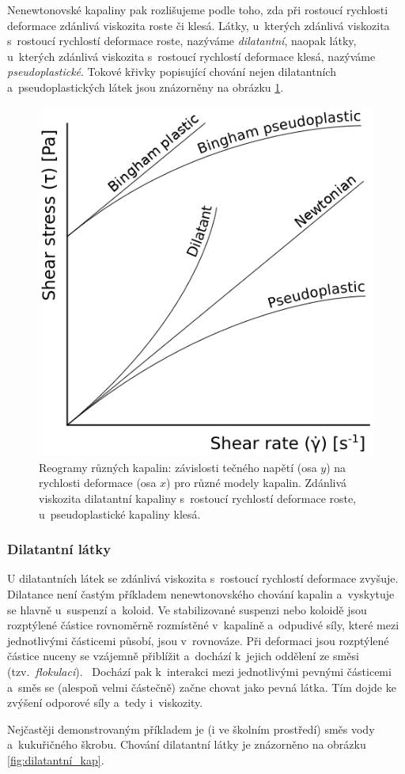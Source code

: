 \documentclass[12pt]{article}
\begin{document}
\par
Nenewtonovské kapaliny pak rozlišujeme podle toho, zda při rostoucí rychlosti deformace zdánlivá viskozita roste či klesá. Látky, u~kterých zdánlivá viskozita s~rostoucí rychlostí deformace roste, nazýváme \emph{dilatantní}, naopak látky, u~kterých zdánlivá viskozita s~rostoucí rychlostí deformace klesá, nazýváme \emph{pseudoplastické}. Tokové křivky popisující chování nejen dilatantních a~pseudoplastických látek jsou znázorněny na obrázku \ref{fig:rheology_diagram}.

\begin{figure}
    \centering
    \includegraphics[width = 0.5\linewidth]{figures/Rheology_of_time_independent_fluids.png}
    \caption{Reogramy různých kapalin: závislosti tečného napětí (osa $y$) na rychlosti deformace (osa $x$) pro různé modely kapalin. Zdánlivá viskozita dilatantní kapaliny s~rostoucí rychlostí deformace roste, u~pseudoplastické kapaliny klesá.~\cite{Figure:rheology_diagram}}
    \label{fig:rheology_diagram}
\end{figure}

\subsubsection{Dilatantní látky}%

U dilatantních látek se zdánlivá viskozita s~rostoucí rychlostí deformace zvyšuje. Dilatance není častým příkladem nenewtonovského chování kapalin a~vyskytuje se hlavně u~suspenzí a~koloid. Ve stabilizované suspenzi nebo koloidě jsou rozptýlené částice rovnoměrně rozmístěné v~kapalině a~odpudivé síly, které mezi jednotlivými částicemi působí, jsou v~rovnováze. Při deformaci jsou rozptýlené částice nuceny se vzájemně přiblížit a~dochází k~jejich oddělení ze směsi (tzv.~\emph{flokulaci}).~\cite{wiki:Flocculation}\cite{prez:teorie_koagulace} Dochází pak k~interakci mezi jednotlivými pevnými částicemi a~směs se (alespoň velmi částečně) začne chovat jako pevná látka. Tím dojde ke zvýšení odporové síly a~tedy i~viskozity.~\cite{wiki:Dilatant}
\par
Nejčastěji demonstrovaným příkladem je (i ve školním prostředí) směs vody a~kukuřičného škrobu. Chování dilatantní látky je znázorněno na obrázku \ref{fig:dilatantní_kap}.
\end{document}
